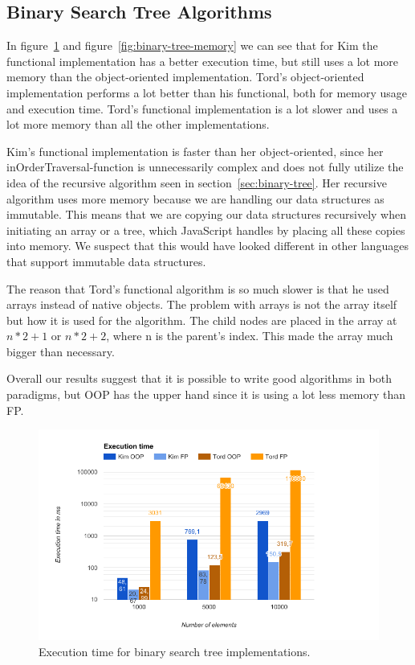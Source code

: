 \documentclass {article}
\begin{document}
\subsection{Binary Search Tree Algorithms}
In figure~\ref{fig:binary-tree-runtime} and figure~\ref{fig:binary-tree-memory} we can see that for Kim the functional implementation has a better execution time, but still uses a lot more memory than the object-oriented implementation. Tord's object-oriented implementation performs a lot better than his functional, both for memory usage and execution time. Tord's functional implementation is a lot slower and uses a lot more memory than all the other implementations.

Kim's functional implementation is faster than her object-oriented, since her inOrderTraversal-function is unnecessarily complex and does not fully utilize the idea of the recursive algorithm seen in section~\ref{sec:binary-tree}. Her recursive algorithm uses more memory because we are handling our data structures as immutable. This means that we are copying our data structures recursively when initiating an array or a tree, which JavaScript handles by placing all these copies into memory. We suspect that this would have looked different in other languages that support immutable data structures. 

The reason that Tord’s functional algorithm is so much slower is that he used arrays instead of native objects. The problem with arrays is not the array itself but how it is used for the algorithm. The child nodes are placed in the array at \(n * 2 + 1\) or \(n * 2 + 2\), where n is the parent's index. This made the array much bigger than necessary. 

Overall our results suggest that it is possible to write good algorithms in both paradigms, but OOP has the upper hand since it is using a lot less memory than FP.

\begin{figure}[H]
\centering
\includegraphics[width=\textwidth]{binary-tree-runtime}

\caption{Execution time for binary search tree implementations.}
\label{fig:binary-tree-runtime}
\end{figure}
\end{document}
